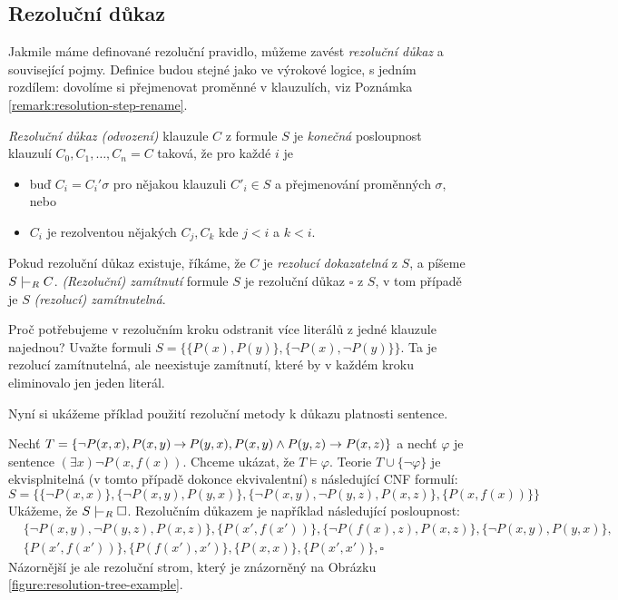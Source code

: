 \subsection{Rezoluční důkaz}

Jakmile máme definované rezoluční pravidlo, můžeme zavést \emph{rezoluční důkaz} a související pojmy. Definice budou stejné jako ve výrokové logice, s jedním rozdílem: dovolíme si přejmenovat proměnné v klauzulích, viz Poznámka \ref{remark:resolution-step-rename}.


\begin{definition}
    \emph{Rezoluční důkaz (odvození)} klauzule $C$ z formule $S$ je \emph{konečná} posloupnost klauzulí $C_0,C_1,\dots,C_n=C$
    taková, že pro každé $i$ je
    \begin{itemize}
        \item buď $C_i=C_i'\sigma$ pro nějakou klauzuli $C'_i\in S$ a přejmenování proměnných $\sigma$, nebo
        \item $C_i$ je rezolventou nějakých $C_j,C_k$ kde $j<i$ a $k<i$.
    \end{itemize}
    Pokud rezoluční důkaz existuje, říkáme, že $C$ je \emph{rezolucí dokazatelná} z $S$, a píšeme $S\proves_R C$. \emph{(Rezoluční) zamítnutí} formule $S$ je rezoluční důkaz $\square$ z $S$, v tom případě je $S$ \emph{(rezolucí) zamítnutelná}.
\end{definition}

\begin{remark}
    Proč potřebujeme v rezolučním kroku odstranit více literálů z jedné klauzule najednou? Uvažte formuli $S=\{\{P(x),P(y)\},\{\neg P(x),\neg P(y)\}\}$. Ta je rezolucí zamítnutelná, ale neexistuje zamítnutí, které by v každém kroku eliminovalo jen jeden literál.
\end{remark}

Nyní si ukážeme příklad použití rezoluční metody k důkazu platnosti sentence.

\begin{example}\label{example:resolution-proof-predicate}
Nechť $T=\{\neg P(x,x),P(x,y) \mathbin{\rightarrow} P(y,x), P(x,y)\land P(y,z)\to P(x,z)\}$ a nechť $\varphi$ je sentence $(\exists x)\neg P(x,f(x))$. Chceme ukázat, že $T\models\varphi$. Teorie $T\cup\{\neg\varphi\}$ je ekvisplnitelná (v tomto případě dokonce ekvivalentní) s následující CNF formulí:
$$S=\{\{\neg P(x,x)\},\{\neg P(x,y),P(y,x)\},\{\neg P(x,y),\neg P(y,z), P(x,z)\},\{P(x,f(x))\}\}$$
Ukážeme, že $S\proves_R\square$. Rezolučním důkazem je například následující posloupnost:
\begin{align*}
    &\{\neg P(x,y),\neg P(y,z), P(x,z)\},
    \{P(x',f(x'))\},
    \{\neg P(f(x),z),P(x,z)\},
    \{\neg P(x,y),P(y,x)\},\\
    &\{P(x',f(x'))\},
    \{P(f(x'),x')\},
    \{P(x,x)\},
    \{P(x',x')\},
    \square
\end{align*}
Názornější je ale rezoluční strom, který je znázorněný na Obrázku \ref{figure:resolution-tree-example}.
\end{example}

